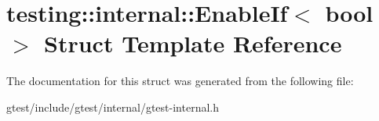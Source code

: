 \hypertarget{structtesting_1_1internal_1_1EnableIf}{}\section{testing\+:\+:internal\+:\+:Enable\+If$<$ bool $>$ Struct Template Reference}
\label{structtesting_1_1internal_1_1EnableIf}


The documentation for this struct was generated from the following file\+:\begin{DoxyCompactItemize}
\item 
gtest/include/gtest/internal/gtest-\/internal.\+h\end{DoxyCompactItemize}
